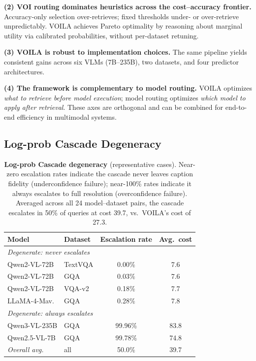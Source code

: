 \textbf{(2) VOI routing dominates heuristics across the cost--accuracy frontier.}
Accuracy-only selection over-retrieves; fixed thresholds under- or over-retrieve unpredictably.
\textsc{VOILA} achieves Pareto optimality by reasoning about marginal utility via calibrated probabilities, without per-dataset retuning.

\textbf{(3) \textsc{VOILA} is robust to implementation choices.}
The same pipeline yields consistent gains across six VLMs (7B--235B), two datasets, and four predictor architectures.

\textbf{(4) The framework is complementary to model routing.}
\textsc{VOILA} optimizes \emph{what to retrieve before model execution}; model routing optimizes \emph{which model to apply after retrieval}.
These axes are orthogonal and can be combined for end-to-end efficiency in multimodal systems.

\subsection*{Log-prob Cascade Degeneracy}

\begin{table}[htb]
\centering
\small
\setlength{\tabcolsep}{3pt}
\caption{\textbf{Log-prob Cascade degeneracy} (representative cases). Near-zero escalation rates indicate the cascade never leaves caption fidelity (underconfidence failure); near-100\% rates indicate it always escalates to full resolution (overconfidence failure). Averaged across all 24 model--dataset pairs, the cascade escalates in 50\% of queries at cost 39.7, vs.\ \textsc{VOILA}'s cost of 27.3.}
\label{tab:cascade_degeneracy}
\begin{tabular}{llcc}
\toprule
\textbf{Model} & \textbf{Dataset} & \textbf{Escalation rate} & \textbf{Avg.\ cost} \\
\midrule
\multicolumn{4}{l}{\textit{Degenerate: never escalates}} \\
Qwen2-VL-72B  & TextVQA & 0.00\% & 7.6 \\
Qwen2-VL-72B  & GQA     & 0.03\% & 7.6 \\
Qwen2-VL-72B  & VQA-v2  & 0.18\% & 7.7 \\
LLaMA-4-Mav.  & GQA     & 0.28\% & 7.8 \\
\midrule
\multicolumn{4}{l}{\textit{Degenerate: always escalates}} \\
Qwen3-VL-235B & GQA     & 99.96\% & 83.8 \\
Qwen2.5-VL-7B & GQA     & 99.78\% & 74.8 \\
\midrule
\textit{Overall avg.} & all & 50.0\% & 39.7 \\
\bottomrule
\end{tabular}
\end{table}
